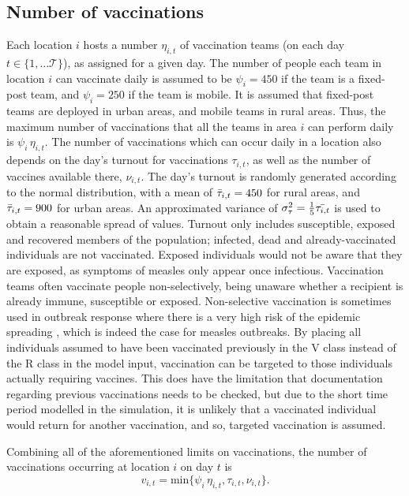 \subsection{Number of vaccinations} %
\label{sec:meth_numVaccs}
Each location $i$ hosts a number $\eta_{i,t}$ of vaccination teams (on each day $t \in \{1,\dots \mathcal{T} \}$), as assigned for a given day. The number of people each team in location $i$ can vaccinate daily is assumed to be $\psi_{i} = 450$ if the team is a fixed-post team, and $\psi_{i} = 250$ if the team is mobile. It is assumed that fixed-post teams are deployed in urban areas, and mobile teams in rural areas. Thus, the maximum number of vaccinations that all the teams in area $i$ can perform daily is $\psi_{i} \,\eta_{i,t}$. 
The number of vaccinations which can occur daily in a location also depends on the day's turnout for vaccinations $\tau_{i,t}$, as well as the number of vaccines available there, $\nu_{i,t}$.  
The day's turnout is randomly generated according to the normal distribution, with a mean of $\Bar{\tau}_{i,t} = 450$ for rural areas, and $\Bar{\tau}_{i,t} = 900$ for urban areas. An approximated variance of $\sigma^2_{\tau} = \frac{1}{5} \Bar{\tau_{i,t}}$ is used to obtain a reasonable spread of values. Turnout only includes susceptible, exposed and recovered members of the population; infected, dead and already-vaccinated individuals are not vaccinated. Exposed individuals would not be aware that they are exposed, as symptoms of measles only appear once infectious. Vaccination teams often vaccinate people non-selectively, being unaware whether a recipient is already immune, susceptible or exposed. Non-selective vaccination is sometimes used in outbreak response where there is a very high risk of the epidemic spreading \cite{danet_fermon_2013}, which is indeed the case for measles outbreaks. By placing all individuals assumed to have been vaccinated previously in the V class instead of the R class in the model input, vaccination can be targeted to those individuals actually requiring vaccines. This does have the limitation that documentation regarding previous vaccinations needs to be checked, but due to the short time period modelled in the simulation, it is unlikely that a vaccinated individual would return for another vaccination, and so, targeted vaccination is assumed.

Combining all of the aforementioned limits on vaccinations, the number of vaccinations occurring at location $i$ on day $t$ is 
$$v_{i,t} = \text{min} \{\psi_{i} \,\eta_{i,t}, \tau_{i,t}, \nu_{i,t} \}.$$ 

